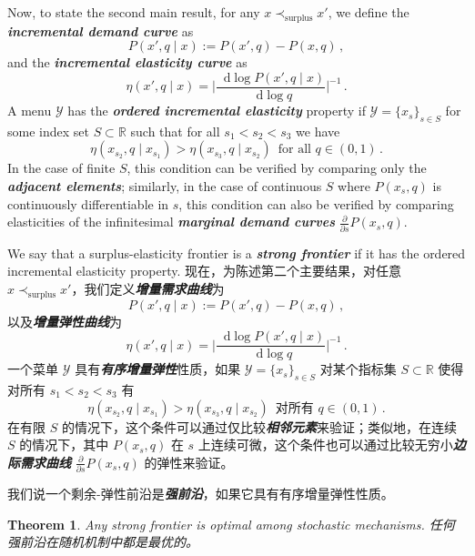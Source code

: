 \documentclass[12pt,letterpaper]{article}
\newenvironment{original}{\color{black}\noindent}{}
\newenvironment{translation}{\color{blue}\noindent}{}
\theoremstyle{plain}
\newtheorem{theorem}{Theorem}
\theoremstyle{definition}
\theoremstyle{remark}
\newcommand{\R}{\mathds{R}}
\newcommand{\Y}{\mathcal{Y}}
\renewcommand{\1}{\mathds{1}}
\renewcommand*\d{\mathop{}\!\mathrm{d}}
\theoremstyle{definition}
\begin{document}
\begin{original}
Now, to state the second main result, for any $x \prec_{\text{surplus}} x'$, we define the \textit{\textbf{incremental demand curve}} as
\[P(x', q\mid x) := P(x', q) - P(x, q)\,,\]
and the \textit{\textbf{incremental elasticity curve}} as
\[\eta(x', q \mid x) = \Bigg|\frac{\d \log P(x', q\mid x)}{\d \log q}\Bigg|^{-1}\,.\]
A menu $\Y$ has the \textit{\textbf{ordered incremental elasticity}} property if $\Y = \{x_s\}_{s \in S}$ for some index set $S \subset \R$ such that for all $s_1 < s_2 < s_3$ we have
\[\eta(x_{s_2}, q \mid x_{s_1}) > \eta(x_{s_3}, q \mid x_{s_2})\, \text{ for all $q \in (0, 1)$}\,.\]
In the case of finite $S$, this condition can be verified by comparing only the \textit{\textbf{adjacent elements}}; similarly, in the case of continuous $S$ where $P(x_s, q)$ is continuously differentiable in $s$, this condition can also be verified by comparing elasticities of the infinitesimal \textit{\textbf{marginal demand curves}} $\frac{\partial }{\partial s} P(x_s, q)$.

We say that a surplus-elasticity frontier is a \textit{\textbf{strong frontier}} if it has the ordered incremental elasticity property.
\end{original}
\begin{translation}
现在，为陈述第二个主要结果，对任意 $x \prec_{\text{surplus}} x'$，我们定义\textit{\textbf{增量需求曲线}}为
\[P(x', q\mid x) := P(x', q) - P(x, q)\,,\]
以及\textit{\textbf{增量弹性曲线}}为
\[\eta(x', q \mid x) = \Bigg|\frac{\d \log P(x', q\mid x)}{\d \log q}\Bigg|^{-1}\,.\]
一个菜单 $\Y$ 具有\textit{\textbf{有序增量弹性}}性质，如果 $\Y = \{x_s\}_{s \in S}$ 对某个指标集 $S \subset \R$ 使得对所有 $s_1 < s_2 < s_3$ 有
\[\eta(x_{s_2}, q \mid x_{s_1}) > \eta(x_{s_3}, q \mid x_{s_2})\, \text{ 对所有 $q \in (0, 1)$}\,.\]
在有限 $S$ 的情况下，这个条件可以通过仅比较\textit{\textbf{相邻元素}}来验证；类似地，在连续 $S$ 的情况下，其中 $P(x_s, q)$ 在 $s$ 上连续可微，这个条件也可以通过比较无穷小\textit{\textbf{边际需求曲线}} $\frac{\partial }{\partial s} P(x_s, q)$ 的弹性来验证。

我们说一个剩余-弹性前沿是\textit{\textbf{强前沿}}，如果它具有有序增量弹性性质。
\end{translation}

\begin{theorem}\label{thm:main2}
\begin{original}
Any strong frontier is optimal among stochastic mechanisms.
\end{original}
\begin{translation}
任何强前沿在随机机制中都是最优的。
\end{translation}
\end{theorem}
\end{document}
